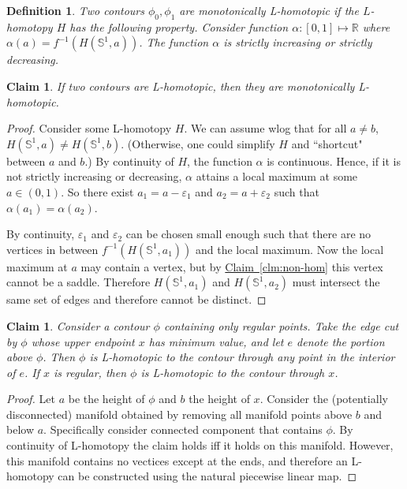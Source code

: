 \documentclass[11pt]{article}
\newtheorem{claim}[theorem]{Claim}
\newtheorem{definition}[theorem]{Definition}
\theoremstyle{definition}
\newcommand{\RR}{\mathbb{R}}
\newcommand{\SSS}{\mathbb{S}}
\newcommand{\eps}{\varepsilon}
\newcommand{\Clm}[1]{\hyperref[clm:#1]{Claim~\ref*{clm:#1}}} %
\begin{document}
{\begin{definition} \label{def:hom-mono} Two contours $\phi_0, \phi_1$ are \emph{monotonically L-homotopic}
if the $L$-homotopy $H$ has the following property. Consider function $\alpha:[0,1] \mapsto \RR$
where $\alpha(a) = f^{-1}(H(\SSS^1,a))$. The function $\alpha$ is strictly increasing or strictly decreasing.
\end{definition}

\begin{claim} \label{clm:mono} If two contours are L-homotopic, then they are monotonically L-homotopic.
\end{claim}

\begin{proof} Consider some L-homotopy $H$. We can assume wlog that for all $a \neq b$, $H(\SSS^1,a) \neq H(\SSS^1,b)$.
(Otherwise, one could simplify $H$ and ``shortcut" between $a$ and $b$.)
By continuity of $H$, the function $\alpha$ is continuous. Hence, if it is not strictly
increasing or decreasing, $\alpha$ attains a local maximum at some $a \in (0,1)$. So there exist $a_1 = a - \eps_1$
and $a_2 = a + \eps_2$ such that $\alpha(a_1) = \alpha(a_2)$.

By continuity, $\eps_1$ and $\eps_2$ can be chosen small enough such that there are no vertices 
in between $f^{-1}(H(\SSS^1,a_1))$ and the local maximum. 
Now the local maximum at $a$ may contain a vertex, but by \Clm{non-hom} this vertex cannot be a saddle.
Therefore $H(\SSS^1,a_1)$ and $H(\SSS^1,a_2)$ must intersect the same set of edges and therefore cannot be distinct.
\end{proof}

\begin{claim} \label{clm:reg} Consider a contour $\phi$ containing only regular points. 
Take the edge cut by $\phi$ whose upper endpoint $x$ has minimum value, and let $e$
denote the portion above $\phi$. Then $\phi$ is L-homotopic to the contour
through any point in the interior of $e$. If $x$ is regular, then $\phi$ is L-homotopic
to the contour through $x$.
\end{claim}

\begin{proof} 
Let $a$ be the height of $\phi$ and $b$ the height of $x$. Consider the (potentially disconnected) 
manifold obtained by removing all manifold points above $b$ and below $a$.  
Specifically consider connected component that contains $\phi$.  
By continuity of L-homotopy the claim holds iff it holds on this manifold. 
However, this manifold contains no vectices except at the ends, and therefore
an L-homotopy can be constructed using the natural piecewise linear map.
\end{proof}

}
\end{document}
